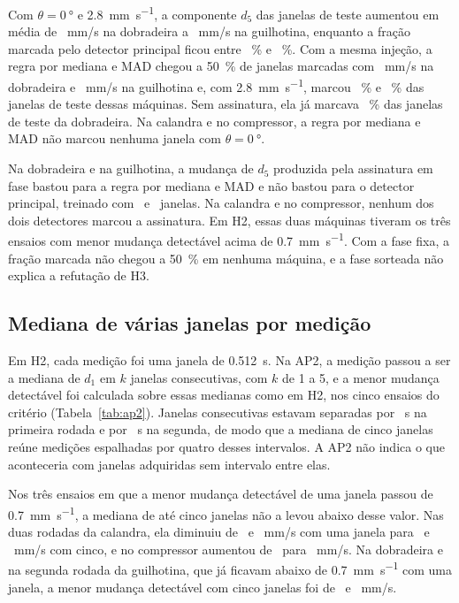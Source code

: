 Com $\theta = \SI{0}{\degree}$ e \SI{2,8}{\milli\meter\per\second}, a componente $d_5$ das janelas de teste aumentou em média de \apUmVariacaoDcincoZeroDobradeira~mm/s na dobradeira a \apUmVariacaoDcincoZeroGuilhotina~mm/s na guilhotina, enquanto a fração marcada pelo detector principal ficou entre \apUmFracaoZeroCompressor~\% e \apUmFracaoZeroCalandra~\%. Com a mesma injeção, a regra por mediana e MAD chegou a \SI{50}{\percent} de janelas marcadas com \apUmMadAcinquentaZeroDobradeira~mm/s na dobradeira e \apUmMadAcinquentaZeroGuilhotina~mm/s na guilhotina e, com \SI{2,8}{\milli\meter\per\second}, marcou \apUmMadFracaoZeroDobradeira~\% e \apUmMadFracaoZeroGuilhotina~\% das janelas de teste dessas máquinas. Sem assinatura, ela já marcava \apUmMadSemAssinaturaDobradeira~\% das janelas de teste da dobradeira. Na calandra e no compressor, a regra por mediana e MAD não marcou nenhuma janela com $\theta = \SI{0}{\degree}$.

Na dobradeira e na guilhotina, a mudança de $d_5$ produzida pela assinatura em fase bastou para a regra por mediana e MAD e não bastou para o detector principal, treinado com \apUmTreinoDobradeira\ e \apUmTreinoGuilhotina\ janelas. Na calandra e no compressor, nenhum dos dois detectores marcou a assinatura. Em H2, essas duas máquinas tiveram os três ensaios com menor mudança detectável acima de \SI{0,7}{\milli\meter\per\second}. Com a fase fixa, a fração marcada não chegou a \SI{50}{\percent} em nenhuma máquina, e a fase sorteada não explica a refutação de H3.

\subsection{Mediana de várias janelas por medição}\label{sec:res-ap2}

Em H2, cada medição foi uma janela de \SI{0,512}{\second}. Na AP2, a medição passou a ser a mediana de $d_1$ em $k$ janelas consecutivas, com $k$ de 1 a 5, e a menor mudança detectável foi calculada sobre essas medianas como em H2, nos cinco ensaios do critério (Tabela~\ref{tab:ap2}). Janelas consecutivas estavam separadas por \campoCicloUm~s na primeira rodada e por \campoCicloDois~s na segunda, de modo que a mediana de cinco janelas reúne medições espalhadas por quatro desses intervalos. A AP2 não indica o que aconteceria com janelas adquiridas sem intervalo entre elas.

Nos três ensaios em que a menor mudança detectável de uma janela passou de \SI{0,7}{\milli\meter\per\second}, a mediana de até cinco janelas não a levou abaixo desse valor. Nas duas rodadas da calandra, ela diminuiu de \apDoisMmdCalandraUmUm\ e \apDoisMmdCalandraDoisUm~mm/s com uma janela para \apDoisMmdCalandraUmCinco\ e \apDoisMmdCalandraDoisCinco~mm/s com cinco, e no compressor aumentou de \apDoisMmdCompressorUmUm\ para \apDoisMmdCompressorUmCinco~mm/s. Na dobradeira e na segunda rodada da guilhotina, que já ficavam abaixo de \SI{0,7}{\milli\meter\per\second} com uma janela, a menor mudança detectável com cinco janelas foi de \apDoisMmdDobradeiraUmCinco\ e \apDoisMmdGuilhotinaDoisCinco~mm/s.

